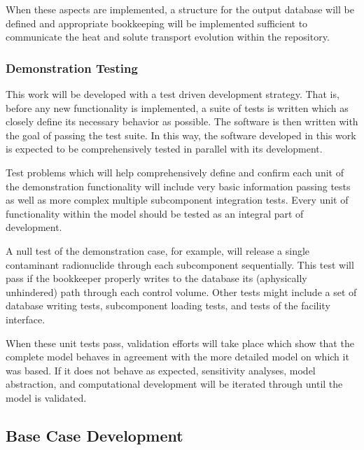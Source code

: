   When these aspects are implemented, a structure for the output database will 
  be defined and appropriate bookkeeping  will be implemented sufficient to 
  communicate the heat and solute transport evolution within the repository. 

\subsubsection{Demonstration Testing}


  This work will be developed with a test driven development strategy. That is, 
  before any new functionality is implemented, a suite of tests is written which 
  as closely define its necessary behavior as possible. The software is then 
  written with the goal of passing the test suite. In this way, the software 
  developed in this work is expected to be comprehensively tested in parallel 
  with its development. 




    Test problems which will help comprehensively define and confirm each unit 
    of the  demonstration functionality will include very basic information 
    passing tests as well as more complex multiple subcomponent integration 
    tests. Every unit of functionality within the model should be tested as an 
    integral part of development.

    A null test of the demonstration case, for example, will release a single 
    contaminant radionuclide through each subcomponent sequentially. This test 
    will pass if  the bookkeeper properly writes to the database its 
    (aphysically unhindered) path through each control volume. Other tests might 
    include a set of database writing tests, subcomponent loading tests, and tests 
    of the facility interface.
    
    When these unit tests pass, validation efforts will take place which show 
    that the complete model behaves in agreement with the more detailed model 
    on which it was based. If it does not behave as expected, sensitivity 
    analyses, model abstraction, and computational development will be iterated 
    through until the model is validated. 


\subsection{Base Case Development}

